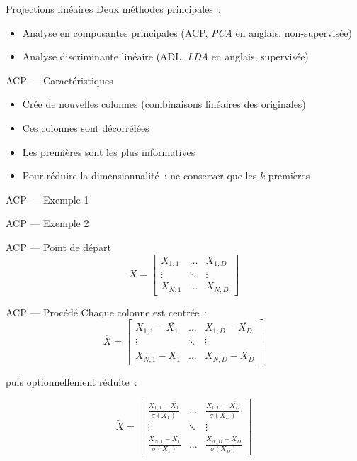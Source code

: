 \begin{frame}{Projections linéaires}
  Deux méthodes principales~:
  \begin{itemize}
    \item Analyse en composantes principales (ACP, \textit{PCA} en anglais, non-supervisée)
    \item Analyse discriminante linéaire (ADL, \textit{LDA} en anglais, supervisée)
  \end{itemize}
\end{frame}

\begin{frame}{ACP --- Caractéristiques}
  \begin{itemize}
    \item Crée de nouvelles colonnes (combinaisons linéaires des originales)
    \item Ces colonnes sont décorrélées
    \item Les premières sont les plus informatives
    \item Pour réduire la dimensionnalité~: ne conserver que les $k$ premières
  \end{itemize}
\end{frame}

\begin{frame}{ACP --- Exemple 1}
\end{frame}

\begin{frame}{ACP --- Exemple 2}
\end{frame}

\begin{frame}{ACP --- Point de départ}
  \[
  X = \begin{bmatrix}
    X_{1,1} & \dots  & X_{1,D} \\
    \vdots & \ddots & \vdots \\
    X_{N,1} & \dots  & X_{N,D}
  \end{bmatrix}
  \]
\end{frame}

\begin{frame}{ACP --- Procédé}
  Chaque colonne est centrée~:
  \[
  \overline{X} =
  \begin{bmatrix}
    X_{1,1}-\overline{X_1} & \dots  & X_{1,D}-\overline{X_D} \\
    \vdots & \ddots & \vdots \\
    X_{N,1}-\overline{X_1} & \dots  & X_{N,D}-\overline{X_D}
  \end{bmatrix}
  \]

  puis optionnellement réduite~:

  \[
  \widetilde{X} =
  \begin{bmatrix}
    \frac{X_{1,1}-\overline{X_1}}{\sigma(X_1)} & \dots  & \frac{X_{1,D}-\overline{X_D}}{\sigma(X_D)} \\
    \vdots & \ddots & \vdots \\
    \frac{X_{N,1}-\overline{X_1}}{\sigma(X_1)} & \dots  & \frac{X_{N,D}-\overline{X_D}}{\sigma(X_D)}
  \end{bmatrix}
  \]
\end{frame}

